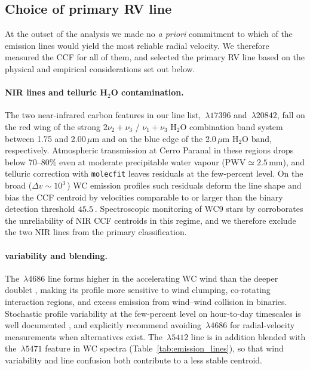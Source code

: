 \subsection{Choice of primary RV line}
\label{sec:primary_line}

At the outset of the analysis we made no \emph{a priori} commitment to
which of the \NlinesAll emission lines would yield the most reliable
radial velocity. We therefore measured the CCF for all of them, and
selected the primary RV line based on the physical and empirical
considerations set out below.

\paragraph{NIR lines and telluric H$_2$O contamination.}
The two near-infrared carbon features in our line list,
\,$\lambda 17396$ and \,$\lambda 20842$, fall on
the red wing of the strong $2\nu_2 + \nu_3$ / $\nu_1 + \nu_3$ H$_2$O
combination band system between 1.75 and 2.00\,$\mu$m and on the blue
edge of the 2.0\,$\mu$m H$_2$O band, respectively. Atmospheric
transmission at Cerro Paranal in these regions drops below 70--80\%
even at moderate precipitable water vapour
($\mathrm{PWV} \simeq 2.5$\,mm), and telluric correction with
\texttt{molecfit} \citep{Smette2015,Kausch2015} leaves residuals at the
few-percent level. On the broad ($\Delta v \sim 10^3$\,\kms) WC
emission profiles such residuals deform the line shape and bias the
CCF centroid by velocities comparable to or larger than the binary
detection threshold $45.5$\,\kms. Spectroscopic monitoring of
WC9 stars by \citet{Williams2000} corroborates the unreliability of
NIR CCF centroids in this regime, and we therefore exclude the two NIR
lines from the primary classification.

\paragraph{ variability and blending.}
The \,$\lambda 4686$ line forms higher in the accelerating
WC wind than the deeper \primaryline doublet
\citep{Hillier1989,Crowther2007}, making its profile more sensitive to
wind clumping, co-rotating interaction regions, and excess emission
from wind--wind collision in binaries. Stochastic profile variability
at the few-percent level on hour-to-day timescales is well documented
\citep{LepineMoffat1999}, and \citet{Shenar2019} explicitly recommend
avoiding \,$\lambda 4686$ for radial-velocity measurements
when alternatives exist. The \,$\lambda 5412$ line is in
addition blended with the \,$\lambda 5471$ feature in WC
spectra (Table~\ref{tab:emission_lines}), so that wind variability and
line confusion both contribute to a less stable centroid.

